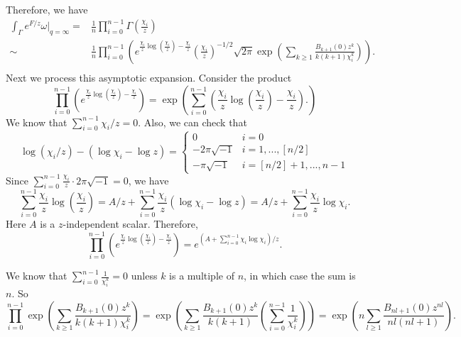 \documentclass[12pt]{amsart}
\numberwithin{equation}{section}
\begin{document}
Therefore, we have  
\begin{equation*}
\begin{split}
\int_\Gamma e^{F/z}\omega|_{q=\infty}=&\frac{1}{n}\prod_{i=0}^{n-1}\Gamma\left(\frac{\chi_i}{z}\right)\\
\sim &\frac{1}{n}\prod_{i=0}^{n-1}\left(e^{\frac{\chi_i}{z}\log\left(\frac{\chi_i}{z}\right)-\frac{\chi_i}{z}} \left(\frac{\chi_i}{z} \right)^{-1/2}\sqrt{2\pi}\exp\left(\sum_{k\geq 1}\frac{B_{k+1}(0)z^k}{k(k+1)\chi_i^k}\right) \right).\\
\end{split}    
\end{equation*}
Next we process this asymptotic expansion. Consider the product
\begin{equation*}
\prod_{i=0}^{n-1}\left(e^{\frac{\chi_i}{z}\log\left(\frac{\chi_i}{z}\right)-\frac{\chi_i}{z}} \right)=\exp\left(\sum_{i=0}^{n-1}\left(\frac{\chi_i}{z}\log\left(\frac{\chi_i}{z} \right)-\frac{\chi_i}{z}\right). \right)    
\end{equation*}
We know that $\sum_{i=0}^{n-1}\chi_i/z=0$. Also, we can check that  
\begin{equation*}
\log(\chi_i/z)-(\log\chi_i-\log z)
=\begin{cases}
0 & i=0\\
-2\pi\sqrt{-1} & i=1,...,[n/2]\\
-\pi\sqrt{-1}  & i=[n/2]+1,...,n-1
\end{cases}   
\end{equation*}
 Since $\sum_{i=0}^{n-1}\frac{\chi_i}{z}\cdot 2\pi\sqrt{-1}=0$, we have $$\sum_{i=0}^{n-1}\frac{\chi_i}{z}\log\left(\frac{\chi_i}{z} \right)=A/z+\sum_{i=0}^{n-1}\frac{\chi_i}{z}(\log\chi_i-\log z)=A/z+\sum_{i=0}^{n-1}\frac{\chi_i}{z}\log\chi_i.$$
Here $A$ is a $z$-independent scalar. Therefore,
\begin{equation*}
\prod_{i=0}^{n-1}\left(e^{\frac{\chi_i}{z}\log\left(\frac{\chi_i}{z}\right)-\frac{\chi_i}{z}} \right)=e^{(A+\sum_{i=0}^{n-1}\chi_i\log\chi_i)/z}.    
\end{equation*}


We know that $\sum_{i=0}^{n-1}\frac{1}{\chi_i^k}=0$ unless $k$ is a multiple of $n$, in which case the sum is $n$. So
\begin{equation*}
\prod_{i=0}^{n-1}\exp\left(\sum_{k\geq 1}\frac{B_{k+1}(0)z^k}{k(k+1)\chi_i^k}\right)=\exp\left(\sum_{k\geq 1}\frac{B_{k+1}(0)z^k}{k(k+1)}\left(\sum_{i=0}^{n-1}\frac{1}{\chi_i^k} \right)\right)=\exp\left(n\sum_{l\geq 1}\frac{B_{nl+1}(0)z^{nl}}{nl(nl+1)}\right).    
\end{equation*}
\end{document}
